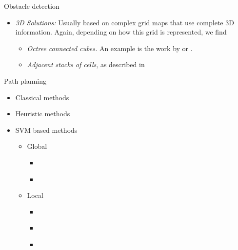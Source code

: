 \begin{frame}{Obstacle detection}
{\begin{itemize}
\begin{itemize}
      \end{itemize} 
      \item \emph{3D Solutions:} Usually based on complex grid maps that use complete 3D information. Again, depending on how this grid is represented, we find 
      \begin{itemize}
	\item \emph{Octree connected cubes.} An example is the work by \cite{wurm2010octomap} or \cite{broggi2013}.
	\item \emph{Adjacent stacks of cells}, as described in \cite{Moravec96robotspatial} 
      \end{itemize}
    \end{itemize}
    }
  \end{frame}

  \begin{frame}{Path planning}
    \begin{itemize}
      \item Classical methods \citep{hwang1992gross}
      \item Heuristic methods \citep{masehian2007classic}
      \item SVM based methods
      \begin{itemize}
       \item Global
	 \begin{itemize}
	  \item \cite{miura2006support}
	  \item \cite{yang2012safe}
	 \end{itemize}
       \item Local
	\begin{itemize}
	  \item \cite{sarkar2008mobile}
	  \item \cite{tennety2009support}
	  \item \cite{qingyang2012local}
	\end{itemize}
      \end{itemize}
    \end{itemize}
    
\end{frame}
